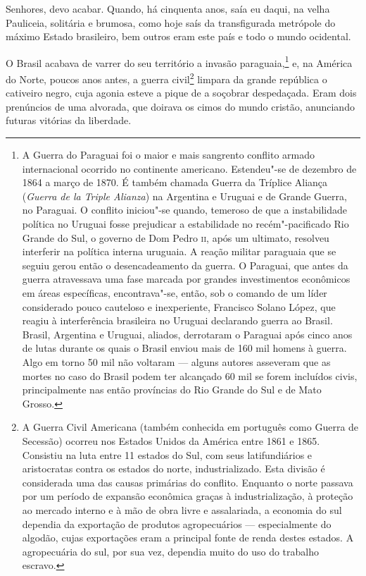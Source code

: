Senhores, devo acabar. Quando, há cinquenta anos, saía eu daqui,
na velha Pauliceia, solitária e brumosa, como hoje saís da
transfigurada metrópole do máximo Estado brasileiro, bem outros eram
este país e todo o mundo ocidental.

O Brasil acabava de varrer do seu território a invasão
paraguaia,\footnote{ A Guerra do Paraguai foi o maior e mais sangrento
conflito armado internacional ocorrido no
continente americano. Estendeu"-se de dezembro
de 1864 a março de
1870. É também chamada Guerra da
Tríplice Aliança (\textit{Guerra de la Triple
Alianza}) na Argentina e Uruguai e de Grande Guerra, no Paraguai. O
conflito iniciou"-se quando, temeroso de que a instabilidade política no
Uruguai fosse prejudicar a estabilidade no recém"-pacificado
Rio Grande do Sul, o governo de
Dom Pedro \textsc{ii}, após um ultimato, resolveu
interferir na política interna uruguaia. A reação militar paraguaia que
se seguiu gerou então o desencadeamento da guerra. O Paraguai, que
antes da guerra atravessava uma fase marcada por grandes investimentos
econômicos em áreas específicas, encontrava"-se, então, sob o comando de
um líder considerado pouco cauteloso e inexperiente,
Francisco Solano López, que reagiu à
interferência brasileira no Uruguai declarando guerra ao Brasil.
Brasil, Argentina e Uruguai, aliados,
derrotaram o Paraguai após cinco anos de lutas
durante os quais o Brasil enviou mais de 160 mil homens à guerra. Algo
em torno 50 mil não voltaram --- alguns autores asseveram que as mortes
no caso do Brasil podem ter alcançado 60 mil se forem incluídos civis,
principalmente nas então províncias do Rio Grande do Sul e de
Mato Grosso.} e, na América do Norte,
poucos anos antes, a guerra civil\footnote{ A Guerra Civil Americana
(também conhecida em português como Guerra de
Secessão) ocorreu nos Estados Unidos da América
entre 1861 e 1865.
Consistiu na luta entre 11 estados do
Sul, com seus latifundiários e
aristocratas contra os estados do
norte, industrializado. Esta divisão é considerada
uma das causas primárias do conflito. Enquanto o norte passava por um
período de expansão econômica graças à industrialização, à proteção ao
mercado interno e à mão de obra livre e
assalariada, a economia do sul dependia da
exportação de produtos agropecuários ---
especialmente do algodão, cujas exportações
eram a principal fonte de renda destes estados. A agropecuária do sul,
por sua vez, dependia muito do uso do trabalho escravo.} limpara
da grande república o cativeiro negro, cuja agonia esteve a pique de a
soçobrar despedaçada. Eram dois prenúncios de uma alvorada, que doirava
os cimos do mundo cristão, anunciando futuras vitórias da liberdade.


